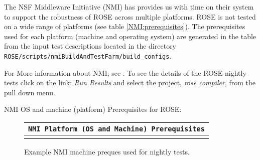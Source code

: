    The NSF Middleware Initiative (NMI) has provides us with 
time on their system to support the robustness of ROSE across
multiple platforms.  ROSE is not tested on a wide range of platforms
(see table \ref{NMI:prerequisites}).  The prerequisites
used for each platform (machine and operating system) are generated
in the table from the input test descriptions located in the 
directory {\tt ROSE/scripts/nmiBuildAndTestFarm/build\_configs}.

For More information about NMI, see
.
To see the details of the ROSE nightly tests click on the link: {\em Run Results}
and select the project, {\em rose compiler}, from the pull down menu.


   NMI OS and machine (platform) Prerequisites for ROSE:
{\indent
\begin{latexonly}
\begin{figure}[tb]
\begin{center}
\begin{tabular}{|c|} \hline
     {\tt NMI Platform (OS and Machine) Prerequisites}
\\\hline\hline
{
\scriptsize
   
}
\\\hline
\end{tabular}
\end{center}
\caption{ Example NMI machine preques used for nightly tests. }
\end{figure}
\end{latexonly}
\label{NMI:prerequisites}
}

